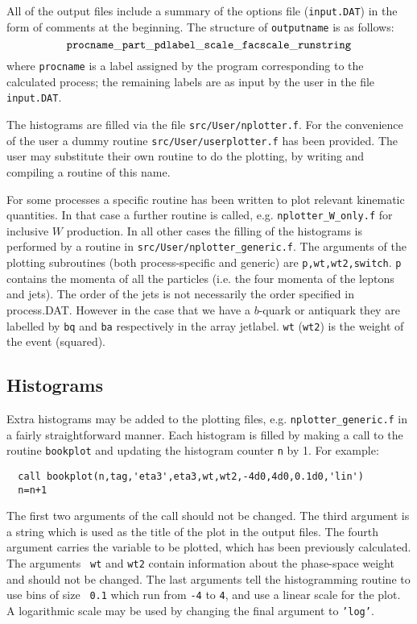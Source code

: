 \documentclass[12pt]{article}
\begin{document}
All of the output files include a summary of the options file ({\tt input.DAT}) in the form of
comments at the beginning. The structure
of {\tt outputname} is as follows:
\begin{displaymath}
{\tt procname\_part\_pdlabel\_scale\_facscale\_runstring}
\end{displaymath}
where {\tt procname} is a label assigned by the program corresponding to
the calculated process; the remaining labels are as input by the user
in the file {\tt input.DAT}.

The histograms are filled via the file {\tt src/User/nplotter.f}. 
For the convenience of the user a dummy routine {\tt src/User/userplotter.f}
has been provided. The user may substitute their own routine to do the plotting,
by writing and compiling a routine of this name.
 
For some processes
a specific routine has been written to plot relevant kinematic quantities. In that case
a further routine is called, e.g. {\tt nplotter\_W\_only.f} for inclusive $W$ production.
In all other cases the filling of the histograms is performed by a routine in
{\tt src/User/nplotter\_generic.f}. The arguments of the plotting subroutines (both process-specific
and generic) are { \tt p,wt,wt2,switch}. {\tt p} contains the momenta of all the particles
(i.e. the four momenta of the leptons and jets). The order of the jets is not
necessarily the  order specified in process.DAT.  However in the case that we have a 
$b$-quark or antiquark they are labelled by {\tt bq} and {\tt ba} respectively
in the array jetlabel. {\tt wt} ({\tt wt2}) is the weight of the event (squared).  

\subsection{Histograms}
\label{sec:histos}

Extra histograms may be added to the plotting files, e.g. {\tt nplotter\_generic.f} in
a fairly straightforward manner. Each histogram is filled by making
a call to the routine {\tt bookplot} and updating the histogram
counter {\tt n} by 1. For example:

\begin{verbatim}
  call bookplot(n,tag,'eta3',eta3,wt,wt2,-4d0,4d0,0.1d0,'lin')
  n=n+1
\end{verbatim}
The first two arguments of the call should not be changed. The third
argument is a string which is used as the title of the plot in the
output files. The fourth argument carries the variable to
be plotted, which has been previously calculated. The arguments {\tt
wt} and {\tt wt2} contain information about the phase-space weight and
should not be changed. The
last arguments tell the histogramming routine to use bins of size {\tt
0.1} which run from {\tt -4} to {\tt 4}, and use a linear scale for
the plot. A logarithmic scale may be used by changing the final
argument to {\tt 'log'}.
\end{document}
